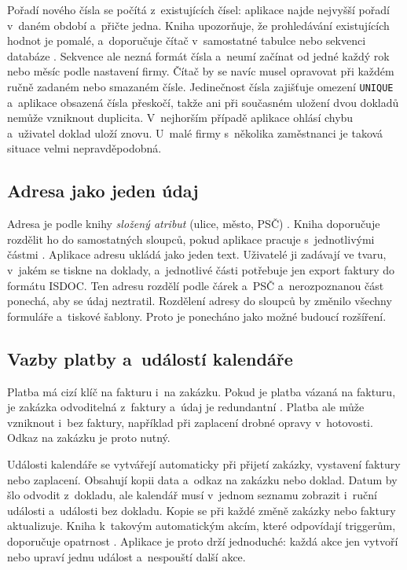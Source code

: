 Pořadí nového čísla se počítá z~existujících čísel: aplikace najde nejvyšší pořadí v~daném období a~přičte jedna. Kniha upozorňuje, že prohledávání existujících hodnot je pomalé, a~doporučuje čítač v~samostatné tabulce nebo sekvenci databáze \cite[s.~160--161]{Silberschatz2020}. Sekvence ale nezná formát čísla a~neumí začínat od jedné každý rok nebo měsíc podle nastavení firmy. Čítač by se navíc musel opravovat při každém ručně zadaném nebo smazaném čísle. Jedinečnost čísla zajišťuje omezení \texttt{UNIQUE} a~aplikace obsazená čísla přeskočí, takže ani při současném uložení dvou dokladů nemůže vzniknout duplicita. V~nejhorším případě aplikace ohlásí chybu a~uživatel doklad uloží znovu. U~malé firmy s~několika zaměstnanci je taková situace velmi nepravděpodobná.

\subsection{Adresa jako jeden údaj}

Adresa je podle knihy \emph{složený atribut} (ulice, město, PSČ) \cite[s.~250]{Silberschatz2020}. Kniha doporučuje rozdělit ho do samostatných sloupců, pokud aplikace pracuje s~jednotlivými částmi \cite[s.~342]{Silberschatz2020}. Aplikace adresu ukládá jako jeden text. Uživatelé ji zadávají ve tvaru, v~jakém se tiskne na doklady, a~jednotlivé části potřebuje jen export faktury do formátu ISDOC. Ten adresu rozdělí podle čárek a~PSČ a~nerozpoznanou část ponechá, aby se údaj neztratil. Rozdělení adresy do sloupců by změnilo všechny formuláře a~tiskové šablony. Proto je ponecháno jako možné budoucí rozšíření.

\subsection{Vazby platby a~událostí kalendáře}

Platba má cizí klíč na fakturu i~na zakázku. Pokud je platba vázaná na fakturu, je zakázka odvoditelná z~faktury a~údaj je redundantní \cite[s.~261--262]{Silberschatz2020}. Platba ale může vzniknout i~bez faktury, například při zaplacení drobné opravy v~hotovosti. Odkaz na zakázku je proto nutný.

Události kalendáře se vytvářejí automaticky při přijetí zakázky, vystavení faktury nebo zaplacení. Obsahují kopii data a~odkaz na zakázku nebo doklad. Datum by šlo odvodit z~dokladu, ale kalendář musí v~jednom seznamu zobrazit i~ruční události a~události bez dokladu. Kopie se při každé změně zakázky nebo faktury aktualizuje. Kniha k~takovým automatickým akcím, které odpovídají triggerům, doporučuje opatrnost \cite[s.~213]{Silberschatz2020}. Aplikace je proto drží jednoduché: každá akce jen vytvoří nebo upraví jednu událost a~nespouští další akce.

